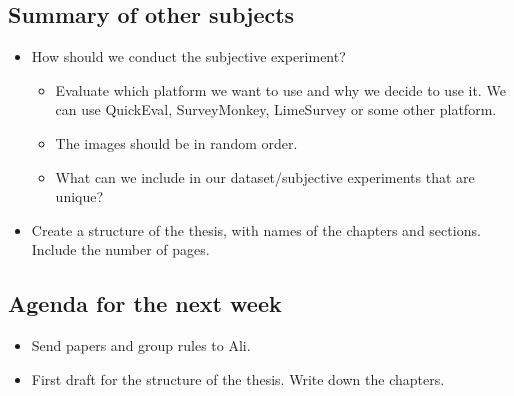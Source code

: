\subsection*{Summary of other subjects}
\begin{itemize}
    \item How should we conduct the subjective experiment?
    \begin{itemize}
        \item Evaluate which platform we want to use and why we decide to use it. We can use QuickEval, SurveyMonkey, LimeSurvey or some other platform.
        \item The images should be in random order.
        \item What can we include in our dataset/subjective experiments that are unique?
    \end{itemize}
    \item Create a structure of the thesis, with names of the chapters and sections. Include the number of pages. 
\end{itemize}

\subsection*{Agenda for the next week}
\begin{itemize}
    \item Send papers and group rules to Ali.
    \item First draft for the structure of the thesis. Write down the chapters.
\end{itemize}

